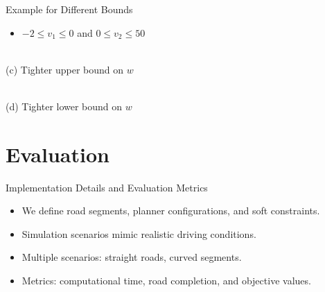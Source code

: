 \documentclass[shortpres,aspectratio=43]{beamer}
\begin{document}
\begin{frame}{Example for Different Bounds}
  \begin{itemize}
    \item $ -2 \leq v_1 \leq 0 $ and $ 0 \leq v_2 \leq 50$
  \end{itemize}
  \centering
  \begin{minipage}[b]{0.45\textwidth}
    \centering
    \resizebox{\textwidth}{!}{}\\
    \small (c) Tighter upper bound on $w$
  \end{minipage}
  \hfill
  \begin{minipage}[b]{0.45\textwidth}
    \centering
    \resizebox{\textwidth}{!}{}\\
    \small (d) Tighter lower bound on $w$
  \end{minipage}

\end{frame}

\section{Evaluation}

\begin{frame}{Implementation Details and Evaluation Metrics}
  \begin{itemize}
    \item We define road segments, planner configurations, and soft constraints.
    \item Simulation scenarios mimic realistic driving conditions.
    \item Multiple scenarios: straight roads, curved segments.
    \item Metrics: computational time, road completion, and objective values.
  \end{itemize}
\end{frame}
\end{document}
